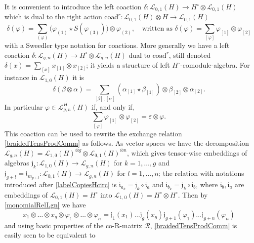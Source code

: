 \documentclass[11pt]{amsart}
\newcommand{\Ll}{\mathcal{L}}
\begin{document}
\indent It is convenient to introduce the left coaction $\delta : \mathcal{L}_{0,1}(H) \to H^\circ \otimes \mathcal{L}_{0,1}(H)$  which is dual to the right action $\mathrm{coad}^r : \mathcal{L}_{0,1}(H) \otimes H \to \mathcal{L}_{0,1}(H)$
 \begin{equation}\label{defCoactCoad}
\delta(\varphi) = \sum_{(\varphi)} \bigl( \varphi_{(1)} \star S(\varphi_{(3)}) \bigr) \otimes \varphi_{(2)}, \quad \text{written as } \delta(\varphi) = \sum_{[\varphi]} \varphi_{[1]} \otimes \varphi_{[2]}
\end{equation}
with a Sweedler type notation for coactions. More generally we have a left coaction $\delta : \mathcal{L}_{g,n}(H) \to H^\circ \otimes \mathcal{L}_{g,n}(H)$   dual to $\mathrm{coad}^r$, still denoted $\delta(x) = \textstyle \sum_{[x]} x_{[1]} \otimes x_{[2]}$; it yields a structure of left $H^\circ$-comodule-algebra. For instance in $\mathcal{L}_{1,0}(H)$ it is
\[ \delta(\beta \otimes \alpha) = \sum_{[\beta],[\alpha]} (\alpha_{[1]} \star \beta_{[1]}) \otimes \beta_{[2]} \otimes \alpha_{[2]}. \]
In particular $\varphi\in \Ll^H_{g,n}(H)$ if, and only if,
\begin{equation}\label{coinvinv}
\sum_{[\varphi]} \varphi_{[1]} \otimes \varphi_{[2]} = \varepsilon \otimes \varphi.
\end{equation}
This coaction can be used to rewrite the exchange relation \eqref{braidedTensProdComm} as follows. As vector spaces we have the decomposition $\mathcal{L}_{g,n}(H) =  \mathcal{L}_{1,0}(H)^{\otimes g} \otimes \mathcal{L}_{0,1}(H)^{\otimes n}$, which gives tensor-wise embeddings of algebras $\mathfrak{j}_k : \mathcal{L}_{1,0}(H) \to \mathcal{L}_{g,n}(H)$ for $k=1,\ldots,g$ and $\mathfrak{j}_{g+l} = \mathfrak{i}_{m_{g+l}} : \mathcal{L}_{0,1}(H) \to \mathcal{L}_{g,n}(H)$ for $l=1,\ldots,n$; the relation with notations introduced after \eqref{labelCopiesHcirc} is $\mathfrak{i}_{a_k} = \mathfrak{j}_k \circ \mathfrak{i}_a$ and $\mathfrak{i}_{b_k} = \mathfrak{j}_k \circ \mathfrak{i}_b$, where $\mathfrak{i}_b,\mathfrak{i}_a$ are embeddings of $\mathcal{L}_{0,1}(H) = H^\circ$ into $\mathcal{L}_{1,0}(H) = H^\circ \otimes H^\circ$. Then by \eqref{monomialRelLgn} we have
\begin{equation}\label{monomialFactoBraided}
x_1 \otimes \ldots \otimes x_g \otimes \varphi_1 \otimes \ldots \otimes \varphi_n = \mathfrak{j}_1(x_1) \ldots \mathfrak{j}_g(x_g)\mathfrak{j}_{g+1}(\varphi_1)\ldots \mathfrak{j}_{g+n}(\varphi_n)
\end{equation}
and using basic properties of the co-R-matrix $\mathcal{R}$, \eqref{braidedTensProdComm} is easily seen to be equivalent to
\end{document}
